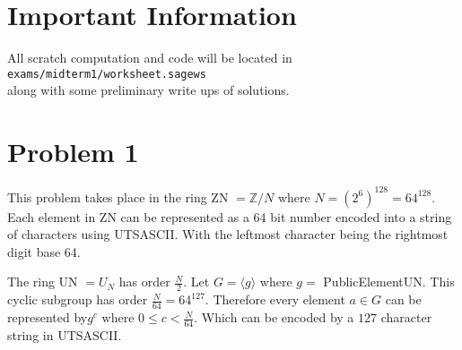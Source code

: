 \documentclass[12pt,letterpaper]{article}
\begin{document}
\section*{Important Information}
All scratch computation and code will be located in \texttt{exams/midterm1/worksheet.sagews}\\ along with some preliminary write ups of solutions.

\section*{Problem 1}

This problem takes place in the ring ZN $=\mathbb{Z}/N$ where $N=(2^6)^{128}=64^{128}$. Each element in ZN can be represented as a $64$ bit number encoded into a string of characters using UTSASCII. With the leftmost character being the rightmost digit base 64.

The ring UN $=U_N$ has order $\frac{N}{2}$. Let $G=\langle g\rangle$ where $g=$ PublicElementUN. This cyclic subgroup has order $\frac{N}{64}=64^{127}$. Therefore every element $a\in G$ can be represented by$g^c$ where $0\leq c < \frac{N}{64}$. Which can be encoded by a $127$ character string in UTSASCII.
\end{document}
